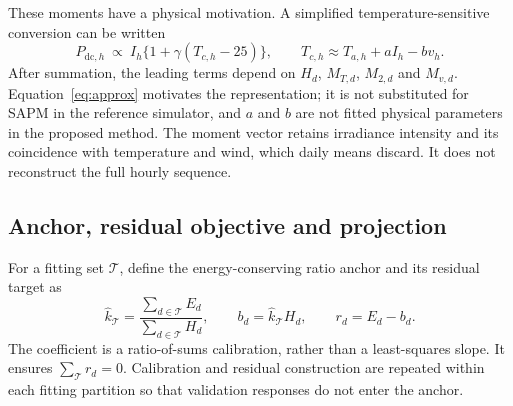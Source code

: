 \documentclass[11pt,a4paper]{article}
\begin{document}
These moments have a physical motivation. A simplified temperature-sensitive conversion can be written
\begin{equation}
 P_{\mathrm{dc},h}\ \propto\ I_h\{1+\gamma(T_{c,h}-25)\},\qquad
 T_{c,h}\approx T_{a,h}+aI_h-bv_h.
 \label{eq:approx}
\end{equation}
After summation, the leading terms depend on $H_d$, $M_{T,d}$, $M_{2,d}$ and $M_{v,d}$. Equation~\eqref{eq:approx} motivates the representation; it is not substituted for SAPM in the reference simulator, and $a$ and $b$ are not fitted physical parameters in the proposed method. The moment vector retains irradiance intensity and its coincidence with temperature and wind, which daily means discard. It does not reconstruct the full hourly sequence.

\subsection{Anchor, residual objective and projection}
For a fitting set $\mathcal T$, define the energy-conserving ratio anchor and its residual target as
\begin{equation}
 \widehat k_{\mathcal T}=\frac{\sum_{d\in\mathcal T}E_d}{\sum_{d\in\mathcal T}H_d},\qquad
 b_d=\widehat k_{\mathcal T}H_d,\qquad r_d=E_d-b_d.
 \label{eq:anchor}
\end{equation}
The coefficient is a ratio-of-sums calibration, rather than a least-squares slope. It ensures $\sum_{\mathcal T}r_d=0$. Calibration and residual construction are repeated within each fitting partition so that validation responses do not enter the anchor.
\end{document}

